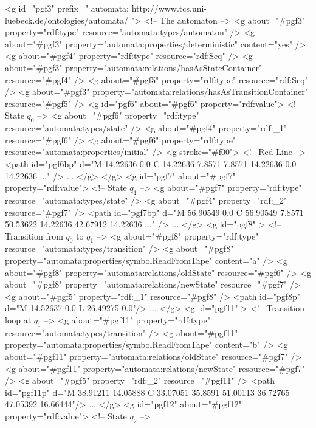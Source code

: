 \begin{codeexample}[multipage]
<g id="pgf3"  prefix=" automata: http://www.tcs.uni-luebeck.de/ontologies/automata/ ">
  <!-- The automaton -->
  <g about="#pgf3" property="rdf:type" resource="automata:types/automaton" />
  <g about="#pgf3" property="automata:properties/deterministic" content="yes" />
  <g about="#pgf4" property="rdf:type" resource="rdf:Seq" />
  <g about="#pgf3" property="automata:relations/hasAsStateContainer" resource="#pgf4" />
  <g about="#pgf5" property="rdf:type" resource="rdf:Seq" />
  <g about="#pgf3" property="automata:relations/hasAsTransitionContainer" resource="#pgf5" />
  <g id="pgf6"  about="#pgf6" property="rdf:value">
    <!-- State $q_0$ -->
    <g about="#pgf6" property="rdf:type" resource="automata:types/state" />
    <g about="#pgf4" property="rdf:_1" resource="#pgf6" />
    <g about="#pgf6" property="rdf:type" resource="automata:properties/initial" />
    <g stroke="#f00">    <!-- Red Line -->
      <path id="pgf6bp" d="M 14.22636 0.0 C 14.22636 7.8571 7.8571 14.22636 0.0 14.22636 ..." />
      ...
    </g>
  </g>
  <g id="pgf7"  about="#pgf7" property="rdf:value">
    <!-- State $q_1$ -->
    <g about="#pgf7" property="rdf:type" resource="automata:types/state" /> 
    <g about="#pgf4" property="rdf:_2" resource="#pgf7" />
    <path id="pgf7bp" d="M 56.90549 0.0 C 56.90549 7.8571 50.53622 14.22636 42.67912 14.22636 ..." />
    ...
  </g>
  <g id="pgf8" >
    <!-- Transition from $q_0$ to $q_1$ -->
    <g about="#pgf8" property="rdf:type" resource="automata:types/transition" />
    <g about="#pgf8" property="automata:properties/symbolReadFromTape" content="a" />
    <g about="#pgf8" property="automata:relations/oldState" resource="#pgf6" />
    <g about="#pgf8" property="automata:relations/newState" resource="#pgf7" />
    <g about="#pgf5" property="rdf:_1" resource="#pgf8" />
    <path id="pgf8p" d="M 14.52637 0.0 L 26.49275 0.0"/>
    ...
  </g>
  <g id="pgf11" >
    <!-- Transition loop at $q_1$ -->
    <g about="#pgf11" property="rdf:type" resource="automata:types/transition" />
    <g about="#pgf11" property="automata:properties/symbolReadFromTape" content="b" />
    <g about="#pgf11" property="automata:relations/oldState" resource="#pgf7" />
    <g about="#pgf11" property="automata:relations/newState" resource="#pgf7" />
    <g about="#pgf5" property="rdf:_2" resource="#pgf11" />
    <path id="pgf11p" d="M 38.91211 14.05888 C 33.07051 35.8591 51.00113 36.72765 47.05392 16.66444"/>
    ...
  </g>
  <g id="pgf12"  about="#pgf12" property="rdf:value">
    <!-- State $q_2$ -->

\end{codeexample}
